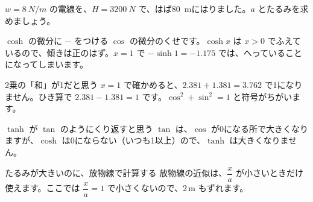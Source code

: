 \begin{jibun}
$w=\qty{8}{N/m}$ の電線を、$H=\qty{3200}{N}$ で、はば\qty{80}{m}にはりました。$a$ とたるみを求めましょう。
\end{jibun}


\begin{tsumazuki}{$\cosh$ の微分に $-$ をつける}
$\cos$ の微分のくせです。$\cosh x$ は $x>0$ でふえているので、傾きは正のはず。$x=1$ で $-\sinh1=-1.175$ では、へっていることになってしまいます。
\end{tsumazuki}

\begin{tsumazuki}{2乗の「和」が1だと思う}
$x=1$ で確かめると、$2.381+1.381=3.762$ で1になりません。ひき算で $2.381-1.381=1$ です。$\cos^2+\sin^2=1$ と符号がちがいます。
\end{tsumazuki}

\begin{tsumazuki}{$\tanh$ が $\tan$ のようにくり返すと思う}
$\tan$ は、$\cos$ が0になる所で大きくなりますが、$\cosh$ は0にならない（いつも1以上）ので、$\tanh$ は大きくなりません。
\end{tsumazuki}

\begin{tsumazuki}{たるみが大きいのに、放物線で計算する}
放物線の近似は、$\dfrac{x}{a}$ が小さいときだけ使えます。ここでは $\dfrac{x}{a}=1$ で小さくないので、2\,m もずれます。
\end{tsumazuki}

